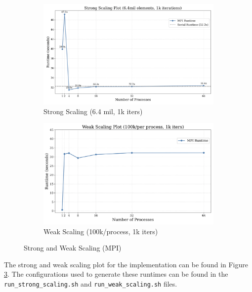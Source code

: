 \documentclass[a4paper,10pt]{article}
\begin{document}
\begin{figure}[H]
     \centering
     \begin{subfigure}[b]{0.45\textwidth}
         \centering
         \includegraphics[width=\textwidth]{../images/3_mpi/strong_scaling.png}
         \caption{Strong Scaling (6.4 mil, 1k iters)}
         \label{fig:3_mpi_strong_scaling}
     \end{subfigure}
     \hfill
     \begin{subfigure}[b]{0.45\textwidth}
         \centering
         \includegraphics[width=\textwidth]{../images/3_mpi/weak_scaling.png}
         \caption{Weak Scaling (100k/process, 1k iters)}
         \label{fig:3_mpi_weak_scaling}
     \end{subfigure}
     \caption{Strong and Weak Scaling (MPI) }
     \label{fig:3_mpi_strong_weak}
\end{figure}

The strong and weak scaling plot for the implementation can be found in Figure \ref{fig:3_mpi_strong_weak}. The configurations used to generate these runtimes can be found in the \verb|run_strong_scaling.sh| and \verb|run_weak_scaling.sh| files.
\end{document}

